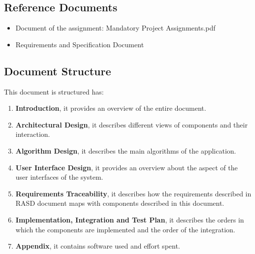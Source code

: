 \subsection{Reference Documents}
\begin{itemize}
\item Document of the assignment: Mandatory Project Assignments.pdf
\item Requirements and Specification Document
\end{itemize}

\subsection{Document Structure}
This document is structured has:
\begin{enumerate}
	\item \textbf{Introduction}, it provides an overview of the entire document.
	\item \textbf{Architectural Design}, it describes different views of components and their interaction.
	\item \textbf{Algorithm Design}, it describes the main algorithms of the application.
	\item \textbf{User Interface Design}, it provides an overview about the aspect of the user interfaces of the system.
	\item \textbf{Requirements Traceability}, it describes how the requirements described in RASD document maps with components described in this document.
	\item \textbf{Implementation, Integration and Test Plan}, it describes the orders in which the components are implemented and the order of the integration.
	\item \textbf{Appendix}, it contains software used and effort spent.
\end{enumerate}



